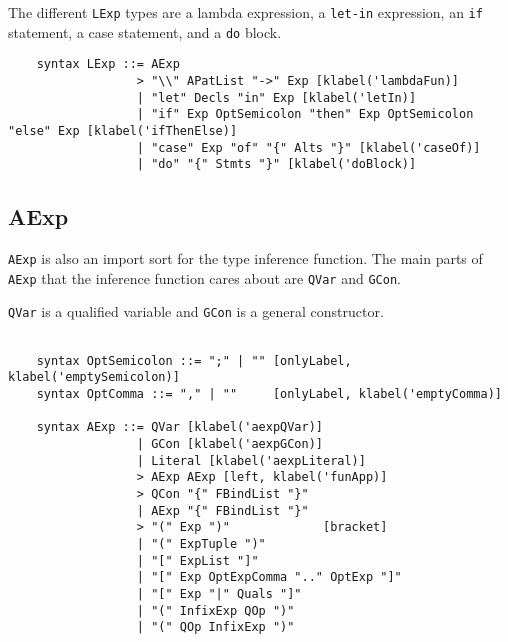 The different \texttt{LExp} types are a lambda expression, a \texttt{let-in} expression, an \texttt{if} statement, a case statement, and a \texttt{do} block.

\begin{lstlisting}
    syntax LExp ::= AExp
                  > "\\" APatList "->" Exp [klabel('lambdaFun)]
                  | "let" Decls "in" Exp [klabel('letIn)]
                  | "if" Exp OptSemicolon "then" Exp OptSemicolon "else" Exp [klabel('ifThenElse)]
                  | "case" Exp "of" "{" Alts "}" [klabel('caseOf)]
                  | "do" "{" Stmts "}" [klabel('doBlock)]

\end{lstlisting}

\subsection{AExp}
\texttt{AExp} is also an import sort for the type inference function. The main parts of \texttt{AExp} that the inference function cares about are \texttt{QVar} and \texttt{GCon}.

\texttt{QVar} is a qualified variable and \texttt{GCon} is a general constructor.

\begin{lstlisting}

    syntax OptSemicolon ::= ";" | "" [onlyLabel, klabel('emptySemicolon)]
    syntax OptComma ::= "," | ""     [onlyLabel, klabel('emptyComma)]

    syntax AExp ::= QVar [klabel('aexpQVar)]
                  | GCon [klabel('aexpGCon)]
                  | Literal [klabel('aexpLiteral)]
                  > AExp AExp [left, klabel('funApp)]
                  > QCon "{" FBindList "}"
                  | AExp "{" FBindList "}"
                  > "(" Exp ")"             [bracket]
                  | "(" ExpTuple ")"
                  | "[" ExpList "]"
                  | "[" Exp OptExpComma ".." OptExp "]"
                  | "[" Exp "|" Quals "]"
                  | "(" InfixExp QOp ")"
                  | "(" QOp InfixExp ")"
                           
\end{lstlisting}
